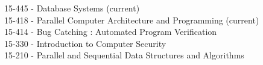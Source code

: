 
\begin{projects}

	\course
	{15-445 -} {Database Systems (current)} \\
	\course
	{15-418 -} {Parallel Computer Architecture and Programming (current)} \\
    \course
    {15-414 -} {Bug Catching : Automated Program Verification} \\
    \course
    {15-330 -} {Introduction to Computer Security} \\
	\course
	{15-210 -} {Parallel and Sequential Data Structures and Algorithms}

\end{projects}
